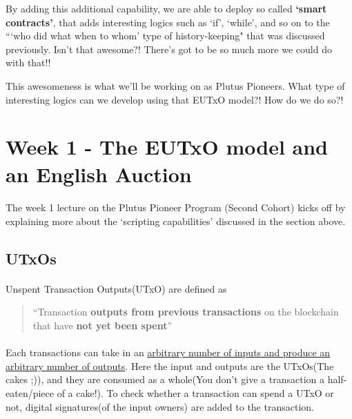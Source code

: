 \documentclass[a4paper, 11pt]{article}
\begin{document}
\begin{description}
        By adding this additional capability, we are able to deploy so called \textbf{`smart contracts'}, that adds interesting logics such as `if', `while', and so on to the ```who did what when to whom' type of history-keeping" that was discussed previously. Isn't that awesome?! There's got to be so much more we could do with that!!

        This awesomeness is what we'll be working on as Plutus Pioneers. What type of interesting logics can we develop using that EUTxO model?! How do we do so?! 
    \end{description}
    


    \vspace{20px}
    \section{Week 1 - The EUTxO model and an English Auction}

    \paragraph{} The week 1 lecture on the Plutus Pioneer Program (Second Cohort) kicks off by explaining more about the `scripting capabilities' discussed in the section above.

    \subsection{UTxOs}
    \paragraph{} Unspent Transaction Outputs(UTxO) are defined as 

    \begin{quotation}
        ``Transaction \textbf{outputs from previous transactions} on the blockchain that have \textbf{not yet been spent}''
    \end{quotation}

    \paragraph{} Each transactions can take in an \ul{arbitrary number of inputs and produce an arbitrary number of outputs}. Here the input and outputs are the UTxOs(The cakes ;)), and they are consumed as a whole(You don't give a transaction a half-eaten/piece of a cake!). To check whether a transaction can spend a UTxO or not, digital signatures(of the input owners) are added to the transaction. 
    
\end{document}
